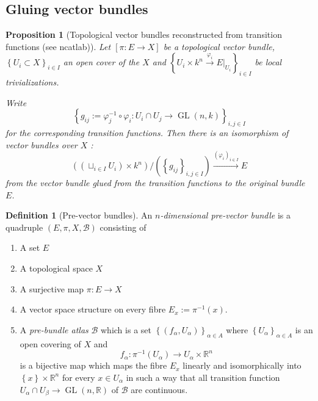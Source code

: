 \documentclass[reqno]{amsart}
\newtheorem{proposition}[theorem]{Proposition}
\theoremstyle{definition}
\newtheorem{definition}[theorem]{Definition}
\theoremstyle{remark}
\DeclareMathOperator{\GL}{GL}
\begin{document}
    \subsection{Gluing vector bundles}
    
    \begin{proposition}[Topological vector bundles reconstructed
        from transition functions (see ncatlab)]
        Let $\left[ \pi \colon E \to X \right] $ be a 
        topological vector bundle,
        $\left\{ U_i \subset X \right\}_{i \in I}$ an open
        cover of the $X$ and
        $\left\{ U_i \times k^{n}
        \stackrel{\varphi_i}{\to } E|_{U_i} \right\}_{i \in I} $
        be local trivializations. 

        Write
        \[
        \left\{ g_{ij} :=
        \varphi_j^{-1} \circ \varphi_i \colon
    U_i \cap U_j \to \GL (n,k) \right\}_{i,j \in I}
        \] 
        for the corresponding transition functions. Then there
        is an isomorphism of vector bundles over
        $X$ :
        \[
            \left( \left( \sqcup_{i \in I} U_i \right) \times 
            k^{n} \right) / \left( \left\{ g_{ij} \right\}_{i,j
        \in I} \right) \stackrel{\left( \varphi_i \right)_{i
        \in I}}{\to } E
        \] 
        from the vector bundle glued from the transition
        functions to the original bundle $E$.
    \end{proposition}

    \begin{definition}[Pre-vector bundles]
        An \textit{$n$-dimensional pre-vector bundle}
        is a quadruple $\left( E, \pi, X,
        \mathcal{B}\right) $ consisting of
        \begin{enumerate}
            \item A set $E$ 
            \item A topological space $X$ 
            \item A surjective map $\pi \colon E \to X$ 
            \item A vector space structure on
                every fibre $E_x := \pi^{-1}(x)$.
            \item A \textit{pre-bundle atlas}
                $\mathcal{B}$ which is a set
                $\left\{ \left( f_{\alpha},U_{\alpha}
                \right) \right\}_{\alpha \in A}$ where
                $\left\{ U_{\alpha} \right\}_{\alpha \in A}$ 
                is an open covering of $X$ and
                \[
                f_{\alpha} \colon \pi^{-1}(U_\alpha) \to 
                U_{\alpha} \times \mathbb{R}^{n}
                \] 
                is a bijective map which maps the
                fibre $E_x$ linearly and isomorphically into
                $\left\{ x \right\} \times \mathbb{R}^{n}$ 
                for every $x \in U_\alpha$ in such a
                way that all transition function
                $U_{\alpha} \cap U_{\beta} \to 
                \GL \left( n, \mathbb{R} \right) $ of
                $\mathcal{B}$ are continuous.
        \end{enumerate}
    \end{definition}
\end{document}
